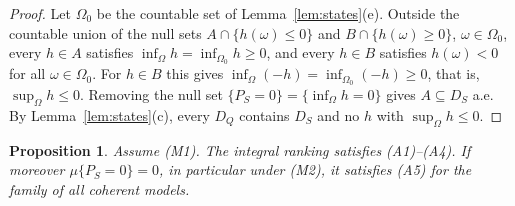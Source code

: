 \documentclass[11pt]{article}
\theoremstyle{plain}
\newtheorem{proposition}[theorem]{Proposition}
\theoremstyle{definition}
\theoremstyle{remark}
\begin{document}
\begin{proof}
Let $\Omega_0$ be the countable set of Lemma~\ref{lem:states}(e). Outside the countable union
of the null sets $A\cap\{h(\omega)\le0\}$ and $B\cap\{h(\omega)\ge0\}$, $\omega\in\Omega_0$,
every $h\in A$ satisfies $\inf_\Omega h=\inf_{\Omega_0}h\ge0$, and every $h\in B$ satisfies
$h(\omega)<0$ for all $\omega\in\Omega_0$. For $h\in B$ this gives $\inf_\Omega(-h)=
\inf_{\Omega_0}(-h)\ge0$, that is, $\sup_\Omega h\le0$. Removing the null set $\{P_S=0\}=
\{\inf_\Omega h=0\}$ gives $A\subseteq D_S$ a.e. By Lemma~\ref{lem:states}(c), every $D_Q$
contains $D_S$ and no $h$ with $\sup_\Omega h\le0$.
\end{proof}

\begin{proposition}\label{prop:axioms}
Assume (M1). The integral ranking satisfies (A1)--(A4). If moreover $\mu\{P_S=0\}=0$, in
particular under (M2), it satisfies (A5) for the family of all coherent models.
\end{proposition}
\end{document}
